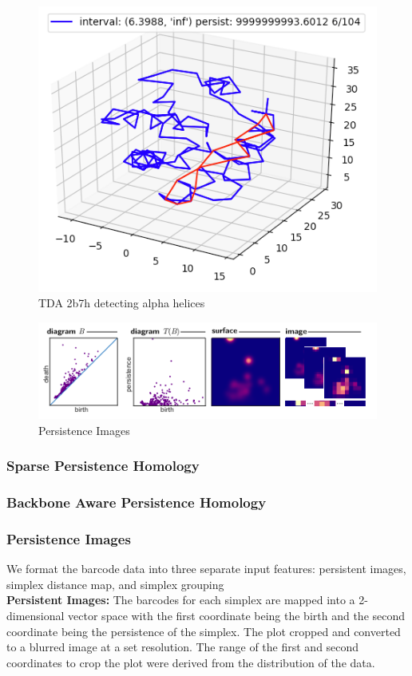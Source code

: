 \documentclass[12pt, a4paper, twocolumn, fullpage]{article}
\theoremstyle{plain}
\theoremstyle{definition}
\theoremstyle{remark}
\begin{document}
\begin{figure}[t]
	\includegraphics[width=\linewidth]{img/hom/Simplex2.png}
	\caption{TDA 2b7h detecting alpha helices }
	\label{fig:tdahelix}
\end{figure}


\begin{figure}[t]
	\includegraphics[width=\linewidth]{persistenceimages.png}
	\caption{Persistence Images}
	\label{fig:boat1}
\end{figure}
\subsubsection{ Sparse Persistence Homology}
\subsubsection{ Backbone Aware Persistence Homology}
\subsubsection{ Persistence Images}
We format the barcode data into three separate input features: persistent images, simplex distance map, and simplex grouping
\\
\textbf{Persistent Images:} The barcodes for each simplex are mapped into a 2-dimensional vector space with the first coordinate being the birth and the second coordinate being the persistence of the simplex. The plot cropped and converted to a blurred image at a set resolution. The range of the first and second coordinates to crop the plot were derived from the distribution of the data.
\end{document}
